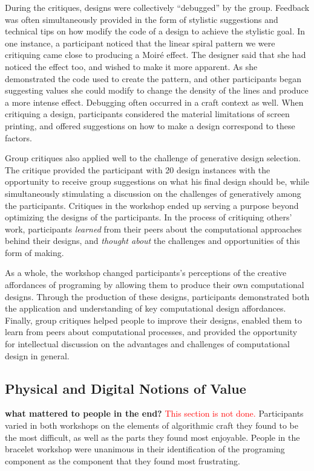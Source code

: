 \documentclass{sigchi}
\begin{document}
During the critiques, designs were collectively ``debugged'' by the group. Feedback was often simultaneously provided in the form of stylistic suggestions and technical tips on how modify the code of a design to achieve the stylistic goal. In one instance, a participant noticed that the linear spiral pattern we were critiquing came close to producing a Moiré effect. The designer said that she had noticed the effect too, and wished to make it more apparent. As she demonstrated the code used to  create the pattern, and other participants began suggesting values she could modify to change the density of the lines and produce a more intense effect. Debugging often occurred in a craft context as well. When critiquing a design, participants considered the material limitations of screen printing, and offered suggestions on how to make a design correspond to these factors.

Group critiques also applied well to the challenge of generative design selection. The critique provided the participant with 20 design instances with the opportunity to receive group suggestions on what his final design should be, while simultaneously stimulating a discussion on the challenges of generatively among the participants. Critiques in the workshop ended up serving a purpose beyond optimizing the designs of the participants. In the process of critiquing others' work, participants \emph{learned} from their peers about the computational approaches behind their designs, and \emph{thought about} the challenges and opportunities of this form of making.

As a whole, the workshop changed participants's perceptions of the creative affordances of programing by allowing them to produce their own computational designs. Through the production of these designs, participants demonstrated both the application and understanding of key computational design affordances. Finally, group critiques helped people to improve their designs, enabled them to learn from peers about computational processes, and provided the opportunity for intellectual discussion on the advantages and challenges of computational design in general.

\subsection{Physical and Digital Notions of Value}
\textbf{what mattered to people in the end?}
\textcolor{red}{This section is not done.}
Participants varied in both workshops on the elements of algorithmic craft they found to be the most difficult, as well as the parts they found most enjoyable. People in the bracelet workshop were unanimous in their identification of the programing component as the component that they found most frustrating.
 
\end{document}
